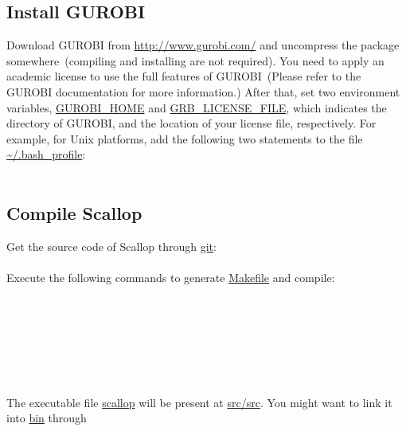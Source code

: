 \documentclass{llncs}
\begin{document}
\subsection{Install GUROBI}
Download GUROBI from \url{http://www.gurobi.com/} and uncompress the
package somewhere~(compiling and installing are not required).
You need to apply an academic license to use
the full features of GUROBI~(Please refer to the GUROBI documentation for more information.)
After that, set two environment
variables, \url{GUROBI_HOME} and \url{GRB_LICENSE_FILE}, which indicates the directory of GUROBI, and
the location of your license file, respectively.
For example, for Unix platforms, add the following
two statements to the file \url{~/.bash_profile}:\\
\\

\subsection{Compile Scallop}
Get the source code of Scallop through \url{git}:\\
\\
Execute the following commands to generate \url{Makefile} and compile:\\
\\
\\
\\
\\
\\
\\
\\
The executable file \url{scallop} will be present at \url{src/src}.
You might want to link it into \url{bin} through\\
\\
\end{document}
